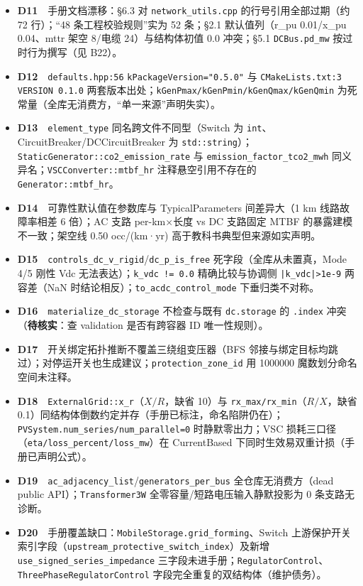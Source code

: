 \documentclass[11pt,a4paper,fontset=fandol]{ctexart}
\newcommand{\file}[1]{\texttt{#1}}
\begin{document}
\begin{itemize}
  \item \textbf{D11}　手册文档漂移：\S 6.3 对 \file{network\_utils.cpp} 的行号引用全部过期（约 72 行）；``48 条工程校验规则''实为 52 条；\S 2.1 默认值列（r\_pu 0.01/x\_pu 0.04、mttr 架空 8/电缆 24）与结构体初值 0.0 冲突；\S 5.1 \texttt{DCBus.pd\_mw} 按过时行为撰写（见 B22）。
  \item \textbf{D12}　\texttt{defaults.hpp:56} \texttt{kPackageVersion="0.5.0"} 与 \file{CMakeLists.txt:3} \texttt{VERSION 0.1.0} 两套版本出处；\texttt{kGenPmax/kGenPmin/kGenQmax/kGenQmin} 为死常量（全库无消费方，``单一来源''声明失实）。
  \item \textbf{D13}　\texttt{element\_type} 同名跨文件不同型（Switch 为 \texttt{int}、CircuitBreaker/DCCircuitBreaker 为 \texttt{std::string}）；\texttt{StaticGenerator::co2\_emission\_rate} 与 \texttt{emission\_factor\_tco2\_mwh} 同义异名；\texttt{VSCConverter::mtbf\_hr} 注释悬空引用不存在的 \texttt{Generator::mtbf\_hr}。
  \item \textbf{D14}　可靠性默认值在参数库与 TypicalParameters 间差异大（1 km 线路故障率相差 6 倍）；AC 支路 per-km$\times$长度 vs DC 支路固定 MTBF 的暴露建模不一致；架空线 0.50 occ/(km·yr) 高于教科书典型但来源如实声明。
  \item \textbf{D15}　\texttt{controls\_dc\_v\_rigid}/\texttt{dc\_p\_is\_free} 死字段（全库从未置真，Mode 4/5 刚性 Vdc 无法表达）；\texttt{k\_vdc != 0.0} 精确比较与协调侧 \texttt{|k\_vdc|>1e-9} 两容差（NaN 时结论相反）；\texttt{to\_acdc\_control\_mode} 下垂归类不对称。
  \item \textbf{D16}　\texttt{materialize\_dc\_storage} 不检查与既有 \texttt{dc.storage} 的 \texttt{.index} 冲突（\textbf{待核实}：查 validation 是否有跨容器 ID 唯一性规则）。
  \item \textbf{D17}　开关绑定拓扑推断不覆盖三绕组变压器（BFS 邻接与绑定目标均跳过）；对停运开关也生成建议；\texttt{protection\_zone\_id} 用 1000000 魔数划分命名空间未注释。
  \item \textbf{D18}　\texttt{ExternalGrid::x\_r}（$X/R$，缺省 10）与 \texttt{rx\_max/rx\_min}（$R/X$，缺省 0.1）同结构体倒数约定并存（手册已标注，命名陷阱仍在）；\texttt{PVSystem.num\_series/num\_parallel=0} 时静默零出力；VSC 损耗三口径（\texttt{eta/loss\_percent/loss\_mw}）在 CurrentBased 下同时生效易双重计损（手册已声明公式）。
  \item \textbf{D19}　\file{ac\_adjacency\_list}/\file{generators\_per\_bus} 全仓库无消费方（dead public API）；\texttt{Transformer3W} 全零容量/短路电压输入静默投影为 0 条支路无诊断。
  \item \textbf{D20}　手册覆盖缺口：\texttt{MobileStorage.grid\_forming}、Switch 上游保护开关索引字段（\texttt{upstream\_protective\_switch\_index}）及新增 \texttt{use\_signed\_series\_impedance} 三字段未进手册；\texttt{RegulatorControl}、\texttt{ThreePhaseRegulatorControl} 字段完全重复的双结构体（维护债务）。
\end{itemize}
\end{document}
